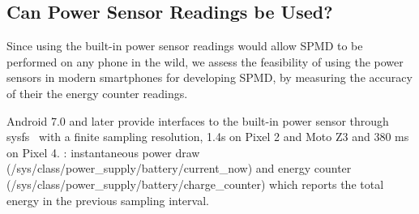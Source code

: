 \subsection{Can Power Sensor Readings be Used?}
\label{subsec:modelling_sensor}

Since using the built-in power sensor readings would allow SPMD to be performed on any phone in the wild,
we assess the feasibility of using the power sensors in modern smartphones for developing SPMD,
by measuring the accuracy of their the energy counter readings.

\begin{sloppy}
Android 7.0 and later provide 
interfaces to the built-in power sensor through sysfs~\cite{linuxsysfs} with
a finite sampling resolution, 1.4s on Pixel 2 and Moto Z3 and 380 ms on Pixel 4.
: instantaneous power draw 
({\small /sys/\-class/\-power\_supply/\-battery/\-current\_now}) and
energy counter ({\small /sys/\-class/\-power\_supply/\-battery/\-charge\_counter})
which reports the total energy in the previous sampling interval.
\end{sloppy}

